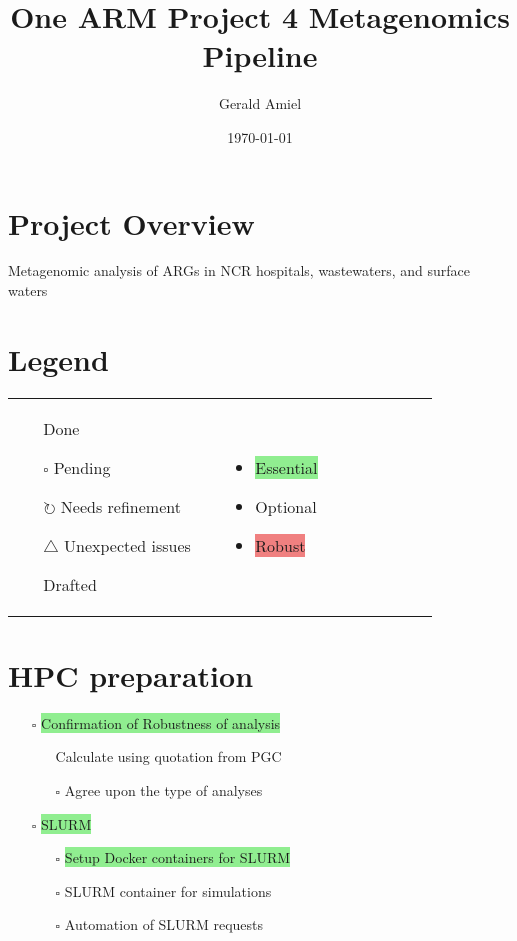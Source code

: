 \documentclass[11pt]{article}
\title{One ARM Project 4 Metagenomics Pipeline}
\author{Gerald Amiel}
\date{\today}
\newcommand{\done}{\checkmark}  %
\newcommand{\pending}{$\square$}  %
\newcommand{\refine}{$\circlearrowright$}  %
\newcommand{\issue}{$\triangle$}  %
\newcommand{\highlightessential}[1]{\colorbox{lightgreen}{#1}}  %
\newcommand{\highlightoptional}[1]{\colorbox{lightorange}{#1}}  %
\newcommand{\highlightrobust}[1]{\colorbox{lightcoral}{#1}}  %
\begin{document}
	
	\twocolumn
	\maketitle
	
	\section{Project Overview}
	Metagenomic analysis of ARGs in NCR hospitals, wastewaters, and surface waters

\section{Legend}
\begin{tabular}{p{0.45\linewidth} p{0.45\linewidth}}  %
	\begin{itemize}
		\item [\done] Done
		\item [\pending] Pending
		\item [\refine] Needs refinement
		\item [\issue] Unexpected issues
		\item [\faPencil] Drafted
	\end{itemize}
	&
	\begin{itemize}
		\item \highlightessential{Essential}
		\item \highlightoptional{Optional}
		\item \highlightrobust{Robust}
	\end{itemize}
\end{tabular}



	
	\section{HPC preparation}
	\begin{itemize}
		\item [\pending] \highlightessential{Confirmation of Robustness of analysis}
			\begin{itemize}
				\item [\done] Calculate using quotation from PGC
				\item [\pending] Agree upon the type of analyses
			\end{itemize}
		\item [\pending] \highlightessential{SLURM}
		\begin{itemize}
			\item [\pending] \highlightessential{Setup Docker containers for SLURM}
			\item [\pending] \highlightoptional{SLURM container for simulations}
			\item [\pending] \highlightoptional{Automation of SLURM requests}
		\end{itemize}

	\end{itemize}
	
\end{document}
